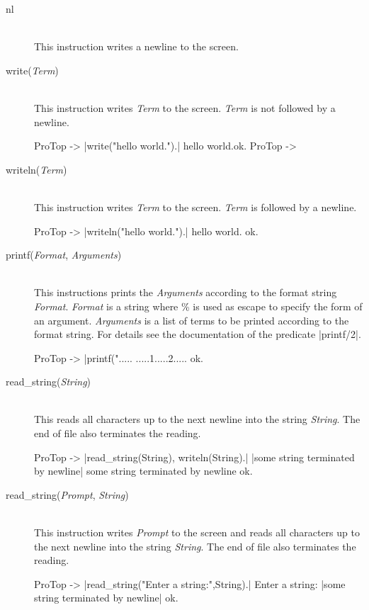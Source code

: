 \begin{description}
  \item [nl]\ \\
  This instruction writes a newline to the screen.
  \item [write({\em Term})]\ \\
  This instruction writes {\em Term}\/ to the screen. {\em Term} is {\sc not}
  followed by a newline.
\begin{BoxedSample}
  ProTop -> |write("hello world.").|
  hello world.ok.
  ProTop -> 
\end{BoxedSample}

  \item [writeln({\em Term})]\ \\
  This instruction writes {\em Term}\/ to the screen. {\em Term} is followed
  by a newline.
\begin{BoxedSample}
  ProTop -> |writeln("hello world.").|
  hello world.
  ok. 
\end{BoxedSample}

  \item [printf({\em Format}, {\em Arguments})]\ \\
  This instructions prints the {\em Arguments} according to the format string
  {\em Format}. {\em Format} is a string where \% is used as escape to specify
  the form of an argument. {\em Arguments} is a list of terms to be printed
  according to the format string. For details see the documentation of the
  \eclipse{} predicate |printf/2|.
\begin{BoxedSample}
  ProTop -> |printf(".....%
  .....1.....2.....
  ok.
\end{BoxedSample}

  \item [read\_string({\em String})]\ \\
  This reads all characters up to the next newline into the string {\em
  String}. The end of file also terminates the reading.
\begin{BoxedSample}
  ProTop -> |read_string(String), writeln(String).|
   |some string terminated by newline|
  some string terminated by newline
  ok.
\end{BoxedSample}

  \item [read\_string({\em Prompt}, {\em String})]\
  \\
  This instruction writes {\em Prompt} to the screen and reads all characters
  up to the next newline into the string {\em String}. The end of file also
  terminates the reading.
\begin{BoxedSample}
  ProTop -> |read_string("Enter a string:",String).|
  Enter a string: |some string terminated by newline|
  ok.
\end{BoxedSample}


\end{description}
